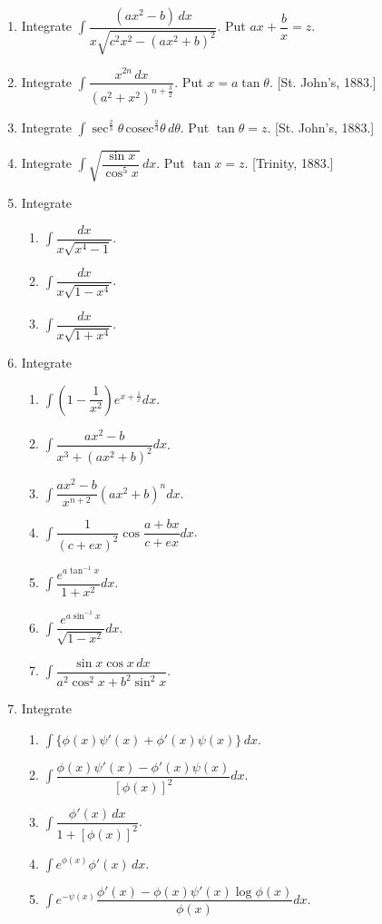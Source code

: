 \documentclass[11pt, a4paper]{article}
\newcommand{\source}[1]{\hfill\textnormal{[#1]}}
\begin{document}
\begin{enumerate}[leftmargin=2em]
\item Integrate $\displaystyle\int \dfrac{(ax^2-b)\,dx}{x\sqrt{c^2x^2-(ax^2+b)^2}}$. Put $ax+\dfrac{b}{x}=z$.

\item Integrate $\displaystyle\int \dfrac{x^{2n}\,dx}{(a^2+x^2)^{n+\frac32}}$. Put $x=a\tan\theta$. \source{St. John's, 1883.}

\item Integrate $\displaystyle\int \sec^{\frac23}\theta\,\text{cosec}^{\frac23}\theta\,d\theta$. Put $\tan\theta=z$. \source{St. John's, 1883.}

\item Integrate $\displaystyle\int \sqrt{\dfrac{\sin x}{\cos^5 x}}\,dx$. Put $\tan x=z$. \source{Trinity, 1883.}

\item Integrate
\begin{enumerate}[label=(\roman*)]
\item $\displaystyle\int \dfrac{dx}{x\sqrt{x^4-1}}$.
\item $\displaystyle\int \dfrac{dx}{x\sqrt{1-x^4}}$.
\item $\displaystyle\int \dfrac{dx}{x\sqrt{1+x^4}}$.
\end{enumerate}

\item Integrate
\begin{enumerate}[label=(\roman*)]
\item $\displaystyle\int \left(1-\dfrac{1}{x^2}\right)e^{x+\frac{1}{x}}dx$.
\item $\displaystyle\int \dfrac{ax^2-b}{x^3+(ax^2+b)^2}dx$.
\item $\displaystyle\int \dfrac{ax^2-b}{x^{n+2}}(ax^2+b)^n dx$.
\item $\displaystyle\int \dfrac{1}{(c+ex)^2}\cos\dfrac{a+bx}{c+ex}dx$.
\item $\displaystyle\int \dfrac{e^{a\tan^{-1}x}}{1+x^2}dx$.
\item $\displaystyle\int \dfrac{e^{a\sin^{-1}x}}{\sqrt{1-x^2}}dx$.
\item $\displaystyle\int \dfrac{\sin x\cos x\,dx}{a^2\cos^2x+b^2\sin^2x}$.
\end{enumerate}

\item Integrate
\begin{enumerate}[label=(\roman*)]
\item $\displaystyle\int \{\phi(x)\psi'(x)+\phi'(x)\psi(x)\}\,dx$.
\item $\displaystyle\int \dfrac{\phi(x)\psi'(x)-\phi'(x)\psi(x)}{[\phi(x)]^2}dx$.
\item $\displaystyle\int \dfrac{\phi'(x)\,dx}{1+[\phi(x)]^2}$.
\item $\displaystyle\int e^{\phi(x)}\phi'(x)\,dx$.
\item $\displaystyle\int e^{-\psi(x)}\dfrac{\phi'(x)-\phi(x)\psi'(x)\log\phi(x)}{\phi(x)}dx$.
\end{enumerate}


\end{enumerate}
\end{document}
